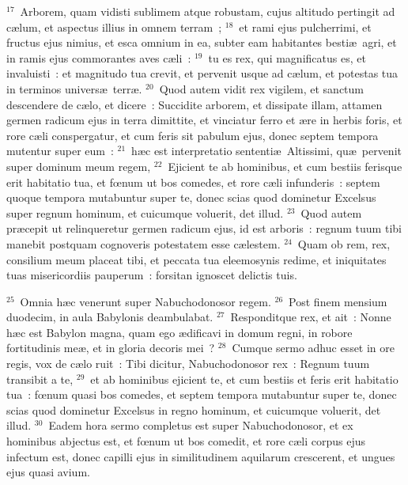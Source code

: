 ${}^{17}$~Arborem, quam vidisti sublimem atque robustam, cujus altitudo pertingit ad c\ae lum, et aspectus illius in omnem terram~;
${}^{18}$~et rami ejus pulcherrimi, et fructus ejus nimius, et esca omnium in ea, subter eam habitantes besti\ae\ agri, et in ramis ejus commorantes aves c\ae li~:
${}^{19}$~tu es rex, qui magnificatus es, et invaluisti~: et magnitudo tua crevit, et pervenit usque ad c\ae lum, et potestas tua in terminos univers\ae\ terr\ae .
${}^{20}$~Quod autem vidit rex vigilem, et sanctum descendere de c\ae lo, et dicere~: Succidite arborem, et dissipate illam, attamen germen radicum ejus in terra dimittite, et vinciatur ferro et \ae re in herbis foris, et rore c\ae li conspergatur, et cum feris sit pabulum ejus, donec septem tempora mutentur super eum~:
${}^{21}$~h\ae c est interpretatio sententi\ae\ Altissimi, qu\ae\ pervenit super dominum meum regem,
${}^{22}$~Ejicient te ab hominibus, et cum bestiis ferisque erit habitatio tua, et fœnum ut bos comedes, et rore c\ae li infunderis~: septem quoque tempora mutabuntur super te, donec scias quod dominetur Excelsus super regnum hominum, et cuicumque voluerit, det illud.
${}^{23}$~Quod autem pr\ae cepit ut relinqueretur germen radicum ejus, id est arboris~: regnum tuum tibi manebit postquam cognoveris potestatem esse c\ae lestem.
${}^{24}$~Quam ob rem, rex, consilium meum placeat tibi, et peccata tua eleemosynis redime, et iniquitates tuas misericordiis pauperum~: forsitan ignoscet delictis tuis.


${}^{25}$~Omnia h\ae c venerunt super Nabuchodonosor regem.
${}^{26}$~Post finem mensium duodecim, in aula Babylonis deambulabat.
${}^{27}$~Responditque rex, et ait~: Nonne h\ae c est Babylon magna, quam ego \ae dificavi in domum regni, in robore fortitudinis me\ae , et in gloria decoris mei~?
${}^{28}$~Cumque sermo adhuc esset in ore regis, vox de c\ae lo ruit~: Tibi dicitur, Nabuchodonosor rex~: Regnum tuum transibit a te,
${}^{29}$~et ab hominibus ejicient te, et cum bestiis et feris erit habitatio tua~: fœnum quasi bos comedes, et septem tempora mutabuntur super te, donec scias quod dominetur Excelsus in regno hominum, et cuicumque voluerit, det illud.
${}^{30}$~Eadem hora sermo completus est super Nabuchodonosor, et ex hominibus abjectus est, et fœnum ut bos comedit, et rore c\ae li corpus ejus infectum est, donec capilli ejus in similitudinem aquilarum crescerent, et ungues ejus quasi avium.


